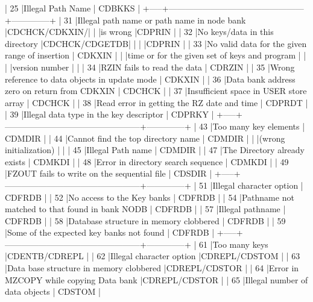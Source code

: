 \begin{XMP}
 |  25 |Illegal Path Name                               |   CDBKKS     |
 +-----+------------------------------------------------+--------------+
 |  31 |Illegal path name or path name in node bank     |CDCHCK/CDKXIN/|
 |     |is wrong                                        |CDPRIN        |
 |  32 |No keys/data in this directory                  |CDCHCK/CDGETDB|
 |     |                                                |CDPRIN        |
 |  33 |No valid data for the given range of insertion  |   CDKXIN     |
 |     |time or for the given set of keys and program   |              |
 |     |version number                                  |              |
 |  34 |RZIN fails to read the data                     |   CDRZIN     |
 |  35 |Wrong reference to data objects in update mode  |   CDKXIN     |
 |  36 |Data bank address zero on return from CDKXIN    |   CDCHCK     |
 |  37 |Insufficient space in USER store array          |   CDCHCK     |
 |  38 |Read error in getting the RZ date and time      |   CDPRDT     |
 |  39 |Illegal data type in the key descriptor         |   CDPRKY     |
 +-----+------------------------------------------------+--------------+
 |  43 |Too many key elements                           |   CDMDIR     |
 |  44 |Cannot find the top directory name              |   CDMDIR     |
 |     |(wrong initialization)                          |              |
 |  45 |Illegal Path name                               |   CDMDIR     |
 |  47 |The Directory already exists                    |   CDMKDI     |
 |  48 |Error in directory search sequence              |   CDMKDI     |
 |  49 |FZOUT fails to write on the sequential file     |   CDSDIR     |
 +-----+------------------------------------------------+--------------+
 |  51 |Illegal character option                        |   CDFRDB     |
 |  52 |No access to the Key banks                      |   CDFRDB     |
 |  54 |Pathname not matched to that found in bank NODB |   CDFRDB     |
 |  57 |Illegal pathname                                |   CDFRDB     |
 |  58 |Database structure in memory clobbered          |   CDFRDB     |
 |  59 |Some of the expected key banks not found        |   CDFRDB     |
 +-----+------------------------------------------------+--------------+
 |  61 |Too many keys                                   |CDENTB/CDREPL |
 |  62 |Illegal character option                        |CDREPL/CDSTOM |
 |  63 |Data base structure in memory clobbered         |CDREPL/CDSTOR |
 |  64 |Error in MZCOPY while copying Data bank         |CDREPL/CDSTOR |
 |  65 |Illegal number of data objects                  |   CDSTOM     |

\end{XMP}
